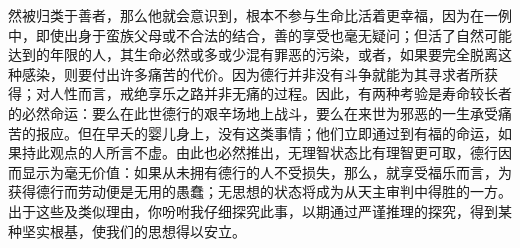 然被归类于善者，那么他就会意识到，根本不参与生命比活着更幸福，因为在一例中，即使出身于蛮族父母或不合法的结合，善的享受也毫无疑问；但活了自然可能达到的年限的人，其生命必然或多或少混有罪恶的污染，或者，如果要完全脱离这种感染，则要付出许多痛苦的代价。因为德行并非没有斗争就能为其寻求者所获得；对人性而言，戒绝享乐之路并非无痛的过程。因此，有两种考验是寿命较长者的必然命运：要么在此世德行的艰辛场地上战斗，要么在来世为邪恶的一生承受痛苦的报应。但在早夭的婴儿身上，没有这类事情；他们立即通过到有福的命运，如果持此观点的人所言不虚。由此也必然推出，无理智状态比有理智更可取，德行因而显示为毫无价值：如果从未拥有德行的人不受损失，那么，就享受福乐而言，为获得德行而劳动便是无用的愚蠢；无思想的状态将成为从天主审判中得胜的一方。出于这些及类似理由，你吩咐我仔细探究此事，以期通过严谨推理的探究，得到某种坚实根基，使我们的思想得以安立。\par

